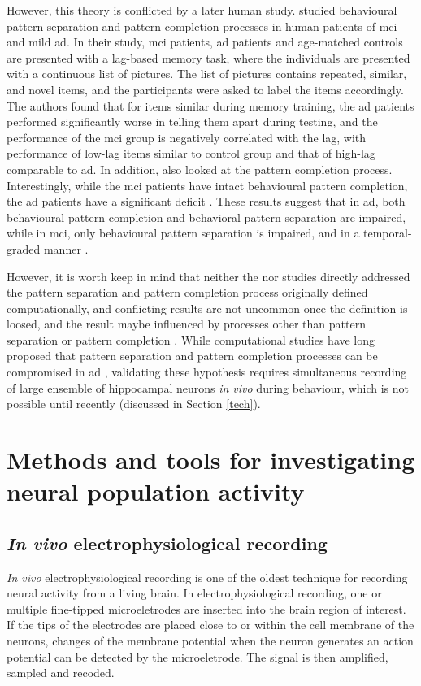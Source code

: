 However, this theory is conflicted by a later human study. \citet{ally13} studied behavioural pattern separation and pattern completion processes in human patients of \gls{mci} and mild \gls{ad}. In their study, \gls{mci} patients, \gls{ad} patients and age-matched controls are presented with a lag-based memory task, where the individuals are presented with a continuous list of pictures. The list of pictures contains repeated, similar, and novel items, and the participants were asked to label the items accordingly. The authors found that for items similar during memory training, the \gls{ad} patients performed significantly worse in telling them apart during testing, and the performance of the \gls{mci} group is negatively correlated with the lag, with performance of low-lag items similar to control group and that of high-lag comparable to \gls{ad}.  In addition, \citet{ally13} also looked at the pattern completion process. Interestingly, while the \gls{mci} patients have intact behavioural pattern completion, the \gls{ad} patients have a significant deficit \citep{ally13}. These results suggest that in \gls{ad}, both behavioural pattern completion and behavioral pattern separation are impaired, while in \gls{mci}, only behavioural pattern separation is impaired, and in a temporal-graded manner \citep{ally13}.

However, it is worth keep in mind that neither the \citet{palmer11} nor \citet{ally13} studies directly addressed the pattern separation and pattern completion process originally defined computationally, and conflicting results are not uncommon once the definition is loosed, and the result maybe influenced by processes other than pattern separation or pattern completion \citep{santoro13}. While computational studies have long proposed that pattern separation and pattern completion processes can be compromised in \gls{ad} \citep{horn93, hasselmo94, hasselmo97}, validating these hypothesis requires simultaneous recording of large ensemble of hippocampal neurons \textit{in vivo} during behaviour, which is not possible until recently (discussed in Section \ref{tech}).  

\section{Methods and tools for investigating neural population activity \label{tech}}
\subsection{\textit{In vivo} electrophysiological recording}
\textit{In vivo} electrophysiological recording is one of the oldest technique for recording neural activity from a living brain. In electrophysiological recording, one or multiple fine-tipped microeletrodes are inserted into the brain region of interest. If the tips of the electrodes are placed close to or within the cell membrane of the neurons, changes of the membrane potential when the neuron generates an action potential can be detected by the microeletrode. The signal is then amplified, sampled and recoded. 

